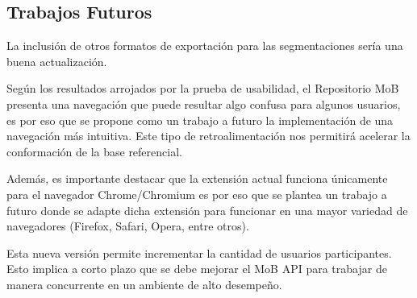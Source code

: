 \documentclass[10pt]{revecom}
\begin{document}
\subsection{Trabajos Futuros}

La inclusión de otros formatos de exportación para las segmentaciones sería una buena actualización.

Según los resultados arrojados por la prueba de usabilidad, el Repositorio MoB presenta una navegación que puede resultar algo confusa para algunos usuarios, es por eso que se propone como un trabajo a futuro la implementación de una navegación más intuitiva. 
Este tipo de retroalimentación nos permitirá acelerar la conformación de la base referencial.

Además, es importante destacar que la extensión actual funciona únicamente para el navegador Chrome/Chromium  es por eso que se plantea un trabajo a futuro donde se adapte dicha extensión para funcionar en una mayor variedad de navegadores (Firefox, Safari, Opera, entre otros).

Esta nueva versión permite incrementar la cantidad de usuarios participantes. Esto implica a corto plazo que se debe mejorar el MoB API para trabajar de manera concurrente en un ambiente de alto desempeño.
\end{document}
